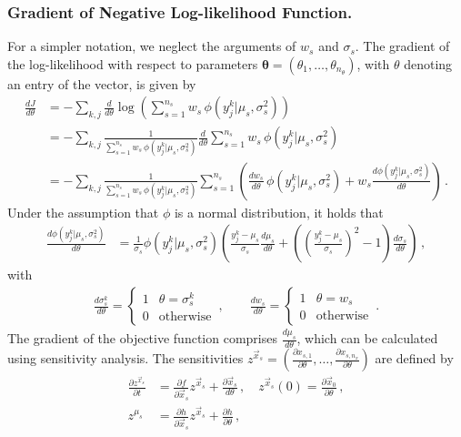 \documentclass{llncs}
\newcommand{\x}{\vec{x}}
\newcommand{\vtheta}{\boldsymbol{\theta}}
\begin{document}
\subsubsection{Gradient of Negative Log-likelihood Function.}
For a simpler notation, we neglect the arguments of $w_s$ and $\sigma_s$. The gradient of the log-likelihood with respect to parameters $\vtheta=\left(\theta_1,\ldots,\theta_{n_\theta}\right)$, with $\theta$ denoting an entry of the vector, is given by
\begin{align*}
\frac{d J}{d \theta} &= -\sum_{k,j} \frac{d}{d\theta} \log\left(\sum_{s=1}^{n_s} w_s\,\phi\left(y_j^{k}|\mu_s, \sigma_s^2\right)\right)\\
&= -\sum_{k,j} \frac{1}{\sum_{s=1}^{n_s} w_s\,\phi\left(y_j^{k}|\mu_s, \sigma_s^2\right)} \frac{d}{d\theta}  \sum_{s=1}^{n_s} w_s\,\phi\left(y_j^{k}|\mu_s, \sigma_s^2\right)\\
&= -\sum_{k,j} \frac{1}{\sum_{s=1}^{n_s} w_s\,\phi\left(y_j^{k}|\mu_s, \sigma_s^2\right)} \sum_{s=1}^{n_s} \left(\frac{d w_s}{d\theta}\,\phi\left(y_j^{k}|\mu_s, \sigma_s^2\right) + w_s \frac{d \phi\left(y_j^{k}|\mu_s, \sigma_s^2\right)}{d\theta}  \right)\,.
\end{align*}
Under the assumption that $\phi$ is a normal distribution, it holds that
\begin{align*}
\frac{d \phi\left(y_j^{k}|\mu_s, \sigma_s^2\right)}{d\theta} &= \frac{1}{\sigma_s}\phi\left(y_j^{k}|\mu_s, \sigma_s^2\right)\left(\frac{y_j^k-\mu_s}{\sigma_s}\frac{d \mu_s}{d\theta}+ \left(\left(\frac{y_j^k-\mu_s}{\sigma_s}\right)^2-1\right)\frac{d\sigma_s}{d\theta}\right)\,,
\end{align*}
with
\begin{align*}
\frac{d \sigma_s^k}{d \theta} = \begin{cases} 
1 & \theta =  \sigma_s^k\\ 
0 & \mbox{otherwise} 
\end{cases}\,,\qquad
\frac{d w_s}{d \theta} = \begin{cases} 
1 & \theta =  w_s\\ 
0 & \mbox{otherwise} 
\end{cases}\,.
\end{align*}
The gradient of the objective function comprises $\frac{d \mu_s}{d\theta}$, which can be calculated using sensitivity analysis. The sensitivities $z^{\x_s} = \left(\frac{\partial x_{s,1}}{ \partial\theta},\ldots,\frac{\partial x_{s,n_x}}{\partial \theta}\right)$ are defined by
\begin{align*}
\frac{\partial z^{\x_s}}{\partial t} &= \frac{\partial f}{\partial \x_s}z^{\x_s} + \frac{\partial \x_s}{d\theta}\,, \quad z^{\x_s}(0) = \frac{\partial \x_0}{\partial \theta}\,,\\
z^{\mu_s} &= \frac{\partial h}{\partial \x_s}z^{\x_s} + \frac{\partial h}{\partial \theta}\,,
\end{align*}
\end{document}
